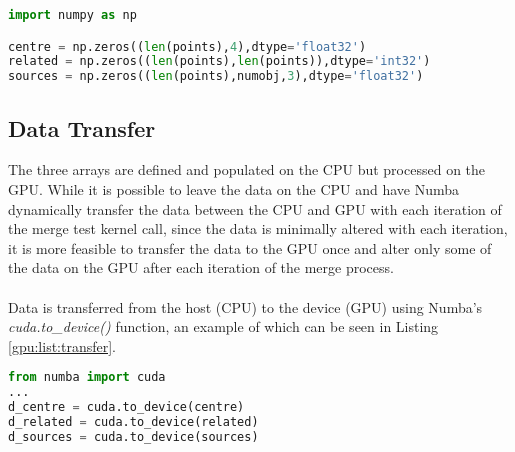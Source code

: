 \begin{lstlisting}[language=Python, label=gpu:list:array]
import numpy as np

centre = np.zeros((len(points),4),dtype='float32')
related = np.zeros((len(points),len(points)),dtype='int32')
sources = np.zeros((len(points),numobj,3),dtype='float32')
\end{lstlisting}
\subsection{Data Transfer}
The three arrays are defined and populated on the CPU but processed on the GPU. While it is possible to leave the data on the CPU and have Numba dynamically transfer the data between the CPU and GPU with each iteration of the merge test kernel call, since the data is minimally altered with each iteration, it is more feasible to transfer the data to the GPU once and alter only some of the data on the GPU after each iteration of the merge process.
\\
\\
Data is transferred from the host (CPU) to the device (GPU) using Numba's \textit{cuda.to\_device()} function, an example of which can be seen in Listing \ref{gpu:list:transfer}.
\begin{lstlisting}[language=Python, label=gpu:list:transfer]
from numba import cuda
...
d_centre = cuda.to_device(centre)
d_related = cuda.to_device(related)
d_sources = cuda.to_device(sources)
\end{lstlisting}
